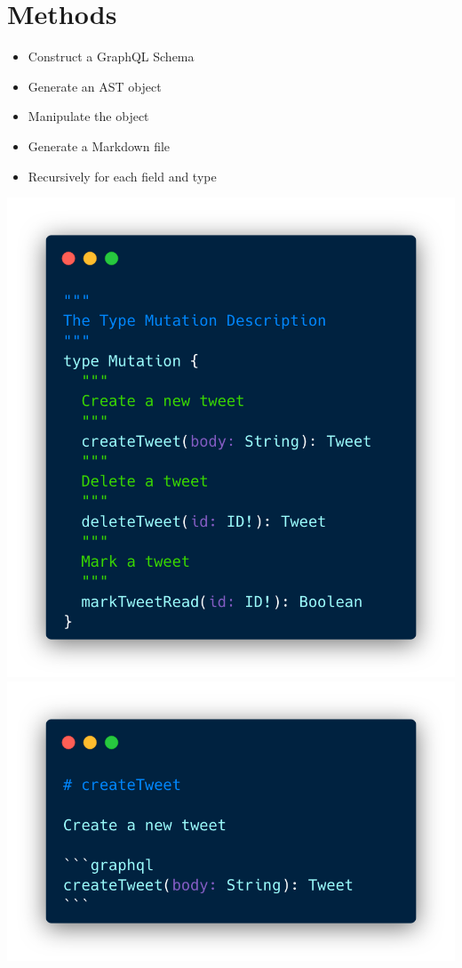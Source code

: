 \documentclass[a2paper,fleqn]{betterposter}
\begin{document}
{}{
\section{Methods}
\begin{itemize}
\item Construct a GraphQL Schema
\item Generate an AST object
\item Manipulate the object
\item Generate a Markdown file
\item Recursively for each field and type
\end{itemize}

\includegraphics[width=\textwidth]{img/graphql}
\includegraphics[width=\textwidth]{img/markdown}

}
\end{document}
